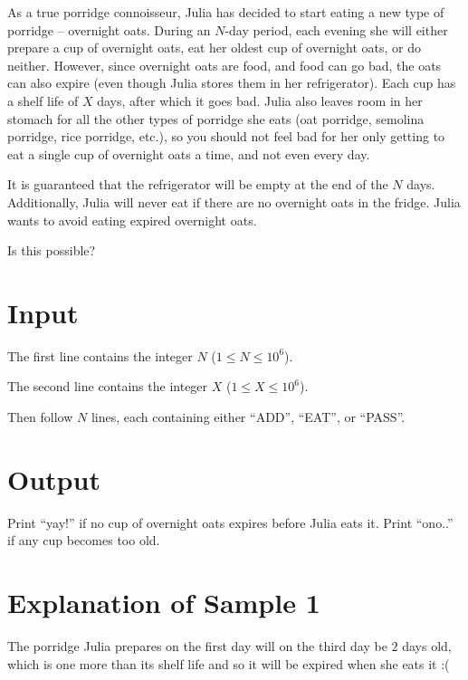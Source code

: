 
As a true porridge connoisseur, Julia has decided to start eating a new type of porridge --
overnight oats. During an $N$-day period, each evening she will either prepare a cup of overnight
oats, eat her oldest cup of overnight oats, or do neither. However, since overnight oats are food,
and food can go bad, the oats can also expire (even though Julia stores them in her refrigerator).
Each cup has a shelf life of $X$ days, after which it goes bad. Julia also leaves room in her
stomach for all the other types of porridge she eats (oat porridge, semolina porridge, rice
porridge, etc.), so you should not feel bad for her only getting to eat a single cup of overnight
oats a time, and not even every day.

It is guaranteed that the refrigerator will be empty at the end of the $N$ days. Additionally, Julia
will never eat if there are no overnight oats in the fridge. Julia wants to avoid eating expired
overnight oats.

Is this possible?

\section*{Input}

The first line contains the integer $N$ ($1 \leq N \leq 10^6$).

The second line contains the integer $X$ ($1 \leq X \leq 10^6$).

Then follow $N$ lines, each containing either ``ADD'', ``EAT'', or ``PASS''.

\section*{Output}

Print ``yay!'' if no cup of overnight oats expires before Julia eats it.
Print ``ono..'' if any cup becomes too old.

\section*{Explanation of Sample 1}

The porridge Julia prepares on the first day will on the third day be $2$ days old, which is one
more than its shelf life and so it will be expired when she eats it :(
